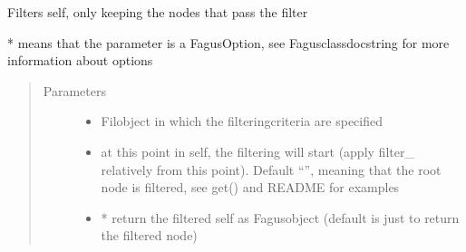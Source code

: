 \documentclass[a4paper,10pt,english]{sphinxmanual}
\begin{document}
\begin{fulllineitems}
\begin{fulllineitems}
\label{\detokenize{fagus.fagus:fagus.fagus.Fagus.filter}}
\pysigstartsignatures
{}
\pysigstopsignatures
\sphinxAtStartPar
Filters self, only keeping the nodes that pass the filter

\sphinxAtStartPar
* means that the parameter is a FagusOption, see Fagus\sphinxhyphen{}class\sphinxhyphen{}docstring for more information about options
\begin{quote}\begin{description}
\item[{Parameters}] \leavevmode\begin{itemize}
\item {}
\sphinxAtStartPar
{} \textendash{} Fil\sphinxhyphen{}object in which the filtering\sphinxhyphen{}criteria are specified

\item {}
\sphinxAtStartPar
{} \textendash{} at this point in self, the filtering will start (apply filter\_ relatively from this point).
Default “”, meaning that the root node is filtered, see get() and README for examples

\item {}
\sphinxAtStartPar
{} \textendash{} * return the filtered self as Fagus\sphinxhyphen{}object (default is just to return the filtered node)


\end{itemize}
\end{description}
\end{quote}
\end{fulllineitems}
\end{fulllineitems}
\end{document}
